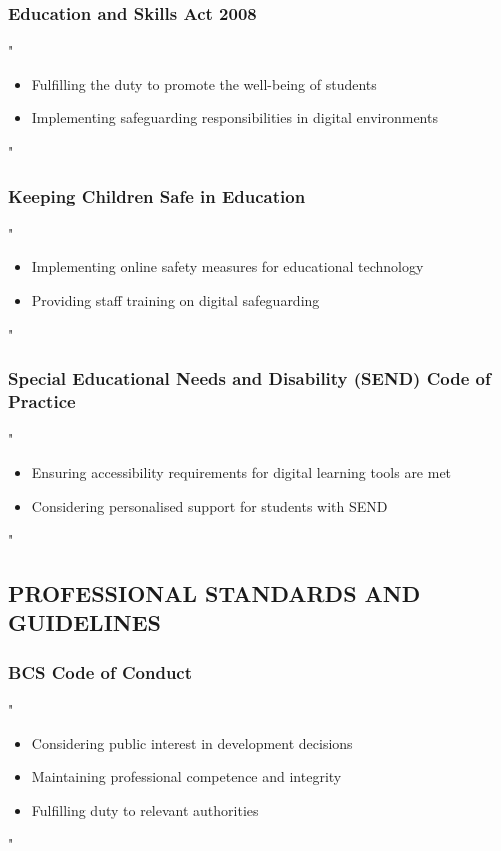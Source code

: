\documentclass[14pt,a4paper]{article}
\begin{document}
\subsubsection*{Education and Skills Act 2008}
"
\begin{itemize}
    \item Fulfilling the duty to promote the well-being of students
    \item Implementing safeguarding responsibilities in digital environments
\end{itemize}
"

\textit{\parencite{UKGov2008}}


\subsubsection*{Keeping Children Safe in Education}
"
\begin{itemize}
    \item Implementing online safety measures for educational technology
    \item Providing staff training on digital safeguarding
\end{itemize}
"

\textit{\parencite{DfE2024a}}

\subsubsection*{Special Educational Needs and Disability (SEND) Code of Practice}
"
\begin{itemize}
    \item Ensuring accessibility requirements for digital learning tools are met
    \item Considering personalised support for students with SEND
\end{itemize}
"

\textit{\parencite{DfE2024b}}


\subsection*{PROFESSIONAL STANDARDS AND GUIDELINES}

\subsubsection*{BCS Code of Conduct}
"
\begin{itemize}
    \item Considering public interest in development decisions
    \item Maintaining professional competence and integrity
    \item Fulfilling duty to relevant authorities
\end{itemize}
"
\end{document}
